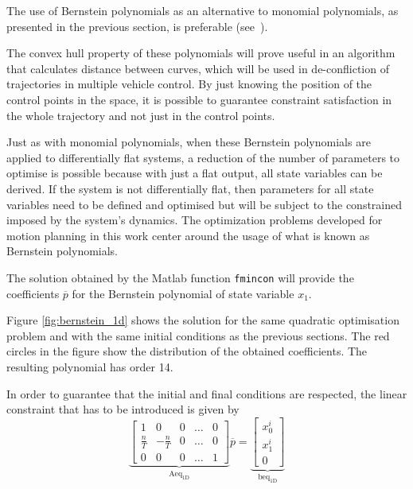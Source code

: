 \par The use of Bernstein polynomials as an alternative to monomial polynomials, as presented in the previous section, is preferable (see~\cite{cichella2018bernstein}). 

The convex hull property of these polynomials will prove useful in an algorithm that calculates distance between curves, which will be used in de-confliction of trajectories in multiple vehicle control. By just knowing the position of the control points in the space, it is possible to guarantee constraint satisfaction in the whole trajectory and not just in the control points.

\par Just as with monomial polynomials, when these Bernstein polynomials are applied to differentially flat systems, a reduction of the number of parameters to optimise is possible because with just a flat output, all state variables can be derived. If the system is not differentially flat, then parameters for all state variables need to be defined and optimised but will be subject to the constrained imposed by the system's dynamics.
The optimization problems developed for motion planning in this work center around the usage of what is known as Bernstein polynomials.

\par The solution obtained by the Matlab function \texttt{fmincon} will provide the coefficients $\overline{p}$ for the Bernstein polynomial of state variable $x_1$. 

\par Figure \ref{fig:bernstein_1d} shows the solution for the same quadratic optimisation problem and with the same initial conditions as the previous sections. The red circles in the figure show the distribution of the obtained coefficients. The resulting polynomial has order 14.

\par In order to guarantee that the initial and final conditions are respected, the linear constraint that has to be introduced is given by
\begin{equation}
    \label{eq:bern_equality}
    \underbrace{\begin{bmatrix}
        1 & 0 & 0 & \dots & 0 \\
        \frac{n}{T} & -\frac{n}{T} & 0 & \dots & 0 \\
        0 & 0 & 0 & \dots & 1 \end{bmatrix}}_{\text{Aeq}_{\text{1D}}} \overline{p} =
    \underbrace{\begin{bmatrix}
        x_0^i \\ x_1^i \\ 0\end{bmatrix}}_{\text{beq}_{\text{1D}}}
\end{equation}


